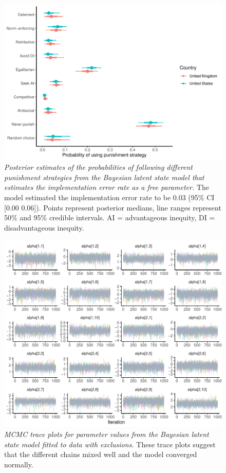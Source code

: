 \documentclass[
  english,
  man, donotrepeattitle,floatsintext]{apa6}
\begin{document}
\begin{figure}
\centering
\includegraphics{manuscript_files/figure-latex/plotModel5-1.pdf}
\caption{\label{fig:plotModel5}\emph{Posterior estimates of the probabilities of following
different punishment strategies from the Bayesian latent state model that
estimates the implementation error rate as a free parameter.} The model
estimated the implementation error rate to be 0.03
(95\% CI {[}0.00
0.06{]}). Points represent posterior medians, line
ranges represent 50\% and 95\% credible intervals. AI = advantageous inequity, DI
= disadvantageous inequity.}
\end{figure}

\newpage





\begin{figure}
\centering
\includegraphics{manuscript_files/figure-latex/plotTrace-1.pdf}
\caption{\label{fig:plotTrace}\emph{MCMC trace plots for parameter values from the Bayesian
latent state model fitted to data with exclusions.} These trace plots suggest
that the different chains mixed well and the model converged normally.}
\end{figure}
\end{document}
